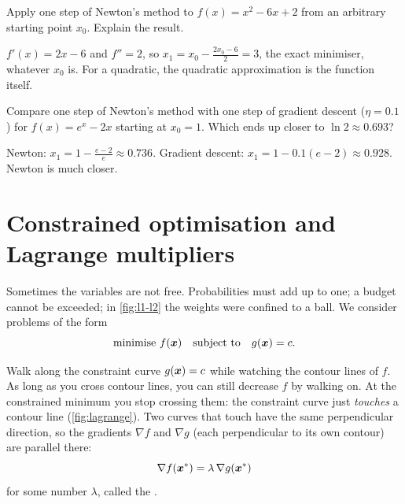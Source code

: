 \sectionexercises

\begin{exercise}
Apply one step of Newton's method to $f(x) = x^2 - 6x + 2$ from an arbitrary
starting point $x_0$. Explain the result.
\end{exercise}
\begin{solution}
$f'(x) = 2x - 6$ and $f'' = 2$, so $x_1 = x_0 - \tfrac{2x_0 - 6}{2} = 3$, the
exact minimiser, whatever $x_0$ is. For a quadratic, the quadratic
approximation is the function itself.
\end{solution}

\begin{exercise}
Compare one step of Newton's method with one step of gradient descent
($\eta = 0.1$) for $f(x) = e^x - 2x$ starting at $x_0 = 1$. Which ends up closer
to $\ln2 \approx 0.693$?
\end{exercise}
\begin{solution}
Newton: $x_1 = 1 - \tfrac{e - 2}{e} \approx 0.736$. Gradient descent:
$x_1 = 1 - 0.1(e - 2) \approx 0.928$. Newton is much closer.
\end{solution}

\section{Constrained optimisation and Lagrange multipliers}\label{sec:lagrange}

Sometimes the variables are not free. Probabilities must add up to one; a
budget cannot be exceeded; in \cref{fig:l1-l2} the weights were confined to a
ball. We consider problems of the form
\[
  \text{minimise } f(\bm{x}) \quad\text{subject to}\quad g(\bm{x}) = c .
\]

\begin{intuition}[Tangency]
Walk along the constraint curve $g(\bm{x}) = c$ while watching the contour lines of
$f$. As long as you cross contour lines, you can still decrease $f$ by walking
on. At the constrained minimum you stop crossing them: the constraint curve just
\emph{touches} a contour line (\cref{fig:lagrange}). Two curves that touch have the
same perpendicular direction, so the gradients $\nabla f$ and $\nabla g$ (each
perpendicular to its own contour) are parallel there:
\[
  \nabla f(\bm{x}^*) = \lambda\,\nabla g(\bm{x}^*)
\]
for some number $\lambda$, called the .
\end{intuition}

